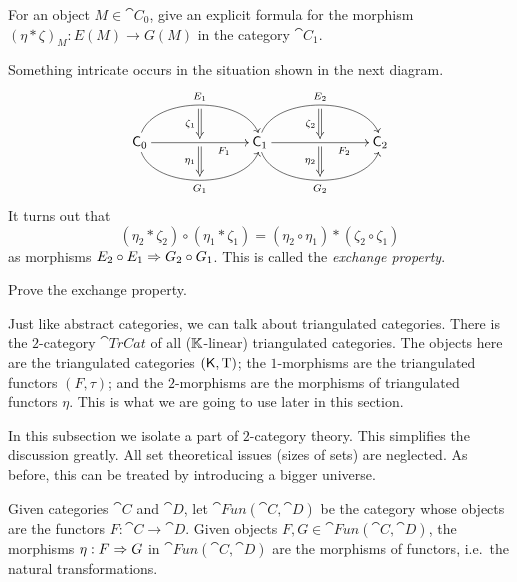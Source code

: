 \begin{exer} \label{exer:1311}
For an object $M \in \cat{C}_0$, give an explicit formula for the morphism
$(\eta * \zeta)_M : E(M) \to G(M)$
in the category $\cat{C}_{1}$.
\end{exer}

Something intricate occurs in the situation shown in the next diagram. 
\[ \UseTips  \xymatrix @C=16ex @R=6ex {
\cat{C}_0
\ar@(u,u)[r]^(0.5){E_1} _(0.5){}="zeta1-s"
\ar[r]_(0.7){F_1}  ^(0.5){}="zeta1-t" _(0.5){}="eta1-s"
\ar@(d,d)[r]_(0.5){G_1}  ^(0.5){}="eta1-t"
\ar@{=>}  "zeta1-s";"zeta1-t" _(0.5){\zeta_1}
\ar@{=>}  "eta1-s";"eta1-t" _(0.5){\eta_1}
&
\cat{C}_1
\ar@(u,u)[r]^(0.5){E_2} _(0.5){}="zeta2-s"
\ar[r]_(0.7){F_2}  ^(0.5){}="zeta2-t" _(0.5){}="eta2-s"
\ar@(d,d)[r]_(0.5){G_2}  ^(0.5){}="eta2-t"
\ar@{=>}  "zeta2-s";"zeta2-t" _(0.5){\zeta_2}
\ar@{=>}  "eta2-s";"eta2-t" _(0.5){\eta_2}
&
\cat{C}_2
} \] 
It turns out that 
\[ (\eta_2 * \zeta_2) \circ (\eta_1 * \zeta_1) = 
(\eta_2 \circ \eta_1) * (\zeta_2 \circ \zeta_1) \]
as morphisms $E_2 \circ E_1 \Rightarrow G_2 \circ G_1$. 
This is called the {\em exchange property}. 

\begin{exer} \label{exer:1312}
Prove the exchange property.
\end{exer}

Just like abstract categories, we can talk about 
triangulated categories. There is the $2$-category $\cat{TrCat}$ 
of all ($\mathbb{K}$-linear) triangulated categories. The objects here are 
the triangulated categories $(\operatorname{\mathsf{K}}, \operatorname{T})$; the $1$-morphisms
are the triangulated functors $(F, \tau)$; and the $2$-morphisms
are the morphisms of triangulated functors $\eta$. This is what we are going 
to use later in this section.




 \label{subsec:fun-cats}

In this subsection we isolate a part of $2$-category theory. This simplifies 
the discussion greatly. All set theoretical issues (sizes of sets) are 
neglected. As before, this can be treated by introducing a bigger universe. 

\begin{dfn} \label{dfn:2025}
Given categories $\cat{C}$ and $\cat{D}$, let 
$\cat{Fun}(\cat{C}, \cat{D})$
be the category whose objects are the functors $F : \cat{C} \to \cat{D}$.
Given objects $F, G \in \cat{Fun}(\cat{C}, \cat{D})$,
the morphisms $\eta : F \Rightarrow G$ in 
$\cat{Fun}(\cat{C}, \cat{D})$ are the morphisms of functors, i.e.\ the  natural 
transformations. 
\end{dfn}

